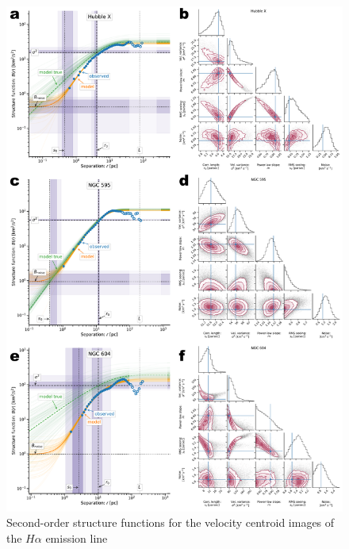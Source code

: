 \documentclass[fleqn,usenatbib, useAMS, a4paper]{mnras}
\begin{document}
\begin{figure}
  \centering
  \includegraphics[width=0.8\linewidth]{Figures/strucfunc-fit-C}
  \caption{Second-order structure functions for the velocity centroid images of the \(H\alpha\) emission line}\label{fig:strucfunc-fit-C}
\end{figure}
\end{document}
